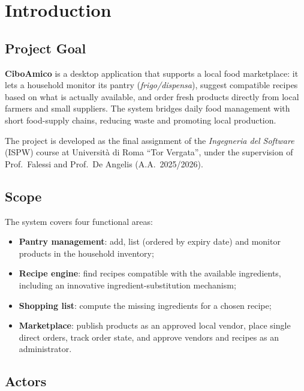 \chapter{Introduction}

\section{Project Goal}

\textbf{CiboAmico} is a desktop application that supports a local food
marketplace: it lets a household monitor its pantry (\emph{frigo/dispensa}),
suggest compatible recipes based on what is actually available, and order fresh
products directly from local farmers and small suppliers. The system bridges
daily food management with short food-supply chains, reducing waste and
promoting local production.

The project is developed as the final assignment of the \emph{Ingegneria del
Software} (ISPW) course at Università di Roma ``Tor Vergata'', under the
supervision of Prof.\ Falessi and Prof.\ De Angelis (A.A.\ 2025/2026).

\section{Scope}

The system covers four functional areas:
\begin{itemize}
    \item \textbf{Pantry management}: add, list (ordered by expiry date) and
    monitor products in the household inventory;
    \item \textbf{Recipe engine}: find recipes compatible with the available
    ingredients, including an innovative ingredient-substitution mechanism;
    \item \textbf{Shopping list}: compute the missing ingredients for a chosen
    recipe;
    \item \textbf{Marketplace}: publish products as an approved local vendor,
    place single direct orders, track order state, and approve vendors and
    recipes as an administrator.
\end{itemize}

\section{Actors}

